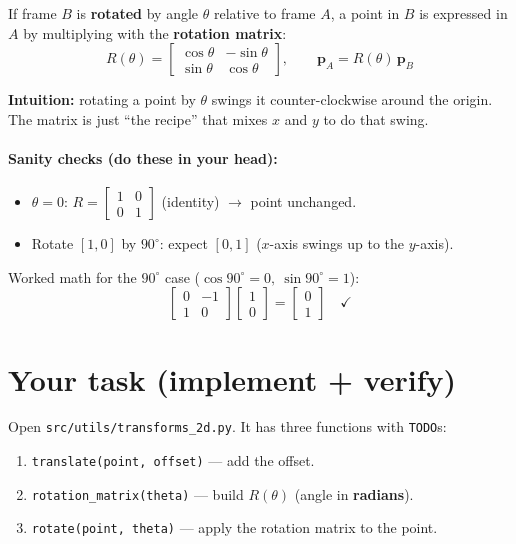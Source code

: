 \documentclass[11pt]{article}
\begin{document}
If frame $B$ is \textbf{rotated} by angle $\theta$ relative to frame $A$, a point in
$B$ is expressed in $A$ by multiplying with the \textbf{rotation matrix}:
\[
  R(\theta) = \begin{bmatrix} \cos\theta & -\sin\theta \\ \sin\theta & \cos\theta \end{bmatrix},
  \qquad
  \mathbf{p}_A = R(\theta)\,\mathbf{p}_B
\]

\textbf{Intuition:} rotating a point by $\theta$ swings it counter-clockwise around
the origin. The matrix is just ``the recipe'' that mixes $x$ and $y$ to do that
swing.

\paragraph{Sanity checks (do these in your head):}
\begin{itemize}[leftmargin=*]
  \item $\theta = 0$: $R = \begin{bmatrix}1&0\\0&1\end{bmatrix}$ (identity)
  $\rightarrow$ point unchanged. \checkmark
  \item Rotate $[1, 0]$ by $90^\circ$: expect $[0, 1]$ ($x$-axis swings up to the
  $y$-axis).
\end{itemize}

Worked math for the $90^\circ$ case ($\cos 90^\circ=0,\ \sin 90^\circ=1$):
\[
  \begin{bmatrix}0&-1\\1&0\end{bmatrix}\begin{bmatrix}1\\0\end{bmatrix}
  = \begin{bmatrix}0\\1\end{bmatrix} \quad\checkmark
\]

\section{Your task (implement + verify)}

Open \texttt{src/utils/transforms\_2d.py}. It has three functions with
\texttt{TODO}s:

\begin{enumerate}[leftmargin=*]
  \item \texttt{translate(point, offset)} --- add the offset.
  \item \texttt{rotation\_matrix(theta)} --- build $R(\theta)$ (angle in
  \textbf{radians}).
  \item \texttt{rotate(point, theta)} --- apply the rotation matrix to the point.
\end{enumerate}
\end{document}
